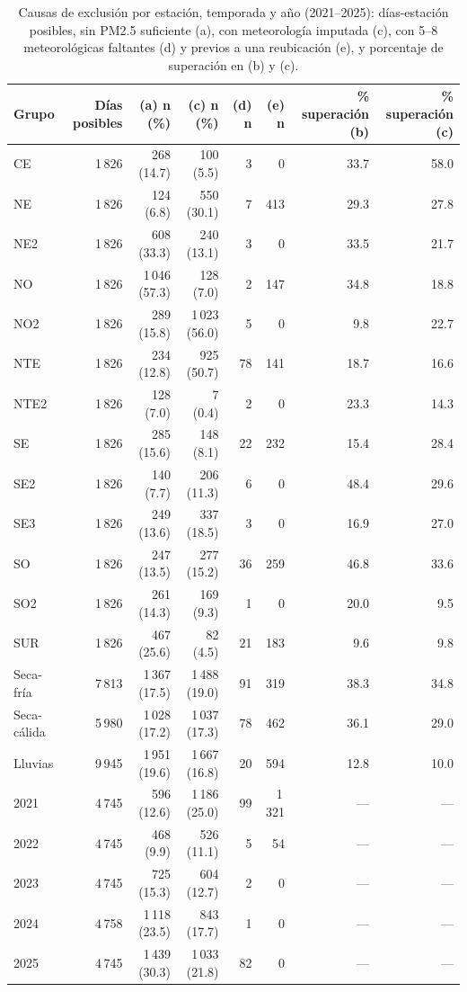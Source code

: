 \begin{table}[H]
\centering\small
\caption{Causas de exclusión por estación, temporada y año (2021–2025): días-estación posibles, sin PM2.5 suficiente (a), con meteorología imputada (c), con 5–8 meteorológicas faltantes (d) y previos a una reubicación (e), y porcentaje de superación en (b) y (c).}
\label{tbl:b-exclusiones}
\begin{tabular}{lrrrrrrr}
\toprule
Grupo & Días posibles & (a) n (\%) & (c) n (\%) & (d) n & (e) n & \% superación (b) & \% superación (c)\\
\midrule
CE & 1\,826 & 268 (14.7) & 100 (5.5) & 3 & 0 & 33.7 & 58.0\\
NE & 1\,826 & 124 (6.8) & 550 (30.1) & 7 & 413 & 29.3 & 27.8\\
NE2 & 1\,826 & 608 (33.3) & 240 (13.1) & 3 & 0 & 33.5 & 21.7\\
NO & 1\,826 & 1\,046 (57.3) & 128 (7.0) & 2 & 147 & 34.8 & 18.8\\
NO2 & 1\,826 & 289 (15.8) & 1\,023 (56.0) & 5 & 0 & 9.8 & 22.7\\
NTE & 1\,826 & 234 (12.8) & 925 (50.7) & 78 & 141 & 18.7 & 16.6\\
NTE2 & 1\,826 & 128 (7.0) & 7 (0.4) & 2 & 0 & 23.3 & 14.3\\
SE & 1\,826 & 285 (15.6) & 148 (8.1) & 22 & 232 & 15.4 & 28.4\\
SE2 & 1\,826 & 140 (7.7) & 206 (11.3) & 6 & 0 & 48.4 & 29.6\\
SE3 & 1\,826 & 249 (13.6) & 337 (18.5) & 3 & 0 & 16.9 & 27.0\\
SO & 1\,826 & 247 (13.5) & 277 (15.2) & 36 & 259 & 46.8 & 33.6\\
SO2 & 1\,826 & 261 (14.3) & 169 (9.3) & 1 & 0 & 20.0 & 9.5\\
SUR & 1\,826 & 467 (25.6) & 82 (4.5) & 21 & 183 & 9.6 & 9.8\\
\midrule
Seca-fría & 7\,813 & 1\,367 (17.5) & 1\,488 (19.0) & 91 & 319 & 38.3 & 34.8\\
Seca-cálida & 5\,980 & 1\,028 (17.2) & 1\,037 (17.3) & 78 & 462 & 36.1 & 29.0\\
Lluvias & 9\,945 & 1\,951 (19.6) & 1\,667 (16.8) & 20 & 594 & 12.8 & 10.0\\
\midrule
2021 & 4\,745 & 596 (12.6) & 1\,186 (25.0) & 99 & 1\,321 & — & —\\
2022 & 4\,745 & 468 (9.9) & 526 (11.1) & 5 & 54 & — & —\\
2023 & 4\,745 & 725 (15.3) & 604 (12.7) & 2 & 0 & — & —\\
2024 & 4\,758 & 1\,118 (23.5) & 843 (17.7) & 1 & 0 & — & —\\
2025 & 4\,745 & 1\,439 (30.3) & 1\,033 (21.8) & 82 & 0 & — & —\\
\bottomrule
\end{tabular}
\end{table}


